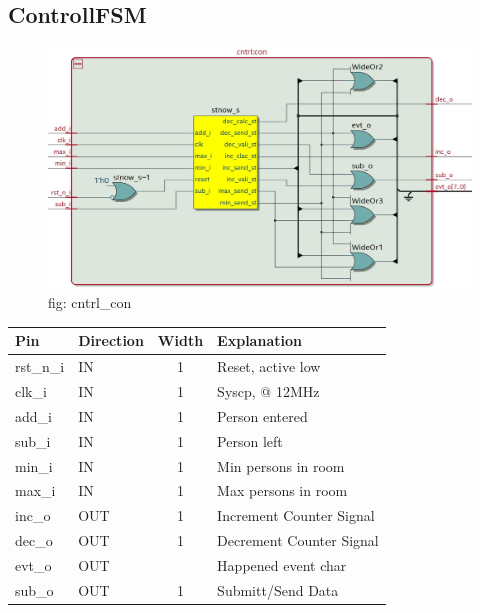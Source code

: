 \documentclass[12pt,a4 paper] {article}
\begin{document}
\subsection{ControllFSM}
\begin{figure}[h]
	\centering	
	\includegraphics[scale=0.3]{../png/cntrl_con.png}
	\newline
	fig: cntrl\_con \\
\end{figure}
\begin{center}
	\begin{tabular}{| p{2cm} | p{2cm} | c| p{4cm} |}
		\hline
		Pin & Direction & Width & Explanation\\
		\hline	
rst\_n\_i & IN & 1 & Reset, active low \\
\hline
clk\_i   & IN  &  1  & Syscp, @ 12MHz\\
\hline
add\_i   & IN  &   1  &         Person entered\\
\hline
sub\_i   & IN  &    1  &              Person left\\
\hline
min\_i   & IN  &     1  &                Min persons in room\\
\hline
max\_i   & IN  &      1  &               Max persons in room\\
\hline
inc\_o   & OUT &       1  &             Increment Counter Signal\\
\hline
dec\_o   & OUT &        1  &             Decrement Counter Signal\\
\hline
evt\_o   & OUT &		 & Happened event char\\
\hline
sub\_o   & OUT & 1  &     Submitt/Send Data\\
\hline
	\end{tabular}
\end{center}
\newpage
\end{document}
